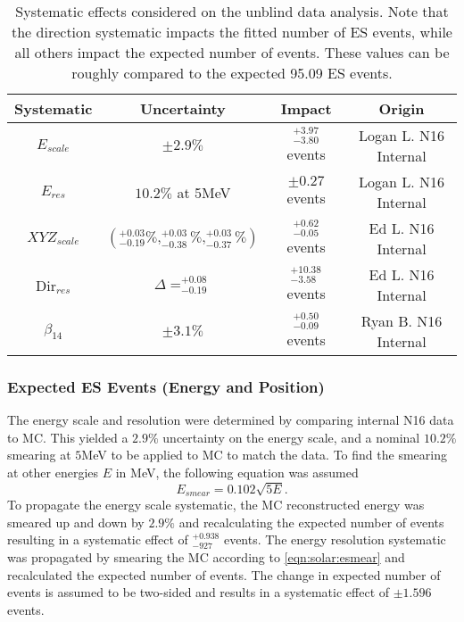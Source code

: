 \begin{table}[]
\begin{center}
\begin{tabular}{c|c|c|c}
Systematic & Uncertainty & Impact & Origin \\ \hline
$E_{scale}$     & $\pm 2.9\%$ & $^{+3.97}_{-3.80}$ events & Logan L. N16 Internal \rule{0pt}{2.6ex}\rule[-1.2ex]{0pt}{0pt}  \\
$E_{res}$       & $10.2\%$ at 5MeV & $\pm0.27$ events & Logan L. N16 Internal  \rule{0pt}{2.6ex}\rule[-1.2ex]{0pt}{0pt}  \\
${XYZ}_{scale}$ & $(^{+0.03}_{-0.19}\%,^{+0.03}_{-0.38}\%,^{+0.03}_{-0.37}\%)$ & $^{+0.62}_{-0.05}$ events & Ed L. N16 Internal  \rule{0pt}{2.6ex}\rule[-1.2ex]{0pt}{0pt}  \\
Dir$_{res}$     &  $\Delta = ^{+0.08}_{-0.19}$ & $^{+10.38}_{-3.58}$ events & Ed L. N16 Internal \rule{0pt}{2.6ex}\rule[-1.2ex]{0pt}{0pt}  \\
$\beta_{14}$ & $\pm 3.1\%$ & $^{+0.50}_{-0.09}$ events & Ryan B. N16 Internal\\ \hline
\end{tabular}
\caption{Systematic effects considered on the unblind data analysis. Note that
    the direction systematic impacts the fitted number of ES events, while
    all others impact the expected number of events. These values can be roughly
    compared to the expected 95.09 ES events.}
\label{tbl:solar:unblind_syst}
\end{center}
\end{table}

\subsubsection{Expected ES Events (Energy and Position)}

The energy scale and resolution were determined by comparing 
internal N16 data to MC. This yielded a $2.9\%$ uncertainty on the energy
scale, and a nominal $10.2\%$ smearing at $5$MeV to be applied to MC to match
the data.
To find the smearing at other energies $E$ in MeV, the following equation was 
assumed
\begin{equation}
\label{eqn:solar:esmear}
E_{smear} = 0.102\sqrt{5 E}.
\end{equation}
To propagate the energy scale systematic, the MC reconstructed energy was 
smeared up and down by $2.9\%$ and recalculating the expected number of events
resulting in  a systematic effect of $^{+0.938}_{-927}$ events. 
The energy resolution systematic was propagated by smearing the MC according to
\ref{eqn:solar:esmear} and recalculated the expected number of events.
The change in expected number of events is assumed to be two-sided and results
in a systematic effect of $\pm1.596$ events.


